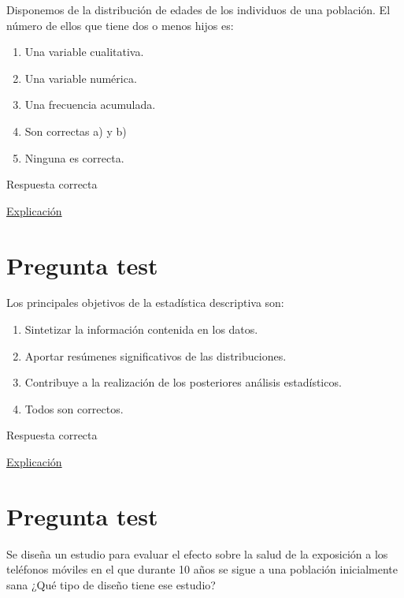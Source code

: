 \documentclass[
]{book}
\providecommand{\tightlist}{%
  \setlength{\itemsep}{0pt}\setlength{\parskip}{0pt}}
\begin{document}
Disponemos de la distribución de edades de los individuos de una población. El número de ellos que tiene dos o menos hijos es:

\begin{enumerate}
\def\labelenumi{\alph{enumi})}
\tightlist
\item
  Una variable cualitativa.
\item
  Una variable numérica.
\item
  Una frecuencia acumulada.
\item
  Son correctas a) y b)
\item
  Ninguna es correcta.
\end{enumerate}

Respuesta correcta

\href{https://1fjmanzano.github.io/bioestadistica/tablas-de-frecuencias.html}{Explicación}

\hypertarget{pregunta-test-31}{%
\section{Pregunta test}\label{pregunta-test-31}}

Los principales objetivos de la estadística descriptiva son:

\begin{enumerate}
\def\labelenumi{\alph{enumi})}
\tightlist
\item
  Sintetizar la información contenida en los datos.
\item
  Aportar resúmenes significativos de las distribuciones.
\item
  Contribuye a la realización de los posteriores análisis estadísticos.
\item
  Todos son correctos.
\end{enumerate}

Respuesta correcta

\href{https://1fjmanzano.github.io/bioestadistica/an\%C3\%A1lisis-exploratorio-de-datos.html}{Explicación}

\hypertarget{pregunta-test-32}{%
\section{Pregunta test}\label{pregunta-test-32}}

Se diseña un estudio para evaluar el efecto sobre la salud de la exposición a los teléfonos móviles en el que durante 10 años se sigue a una población inicialmente sana ¿Qué tipo de diseño tiene ese estudio?
\end{document}
